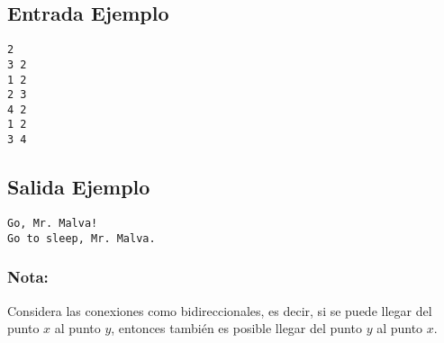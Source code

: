 \begin{multicols}{2}

\subsection*{Entrada Ejemplo}

\begin{verbatim}
2
3 2
1 2
2 3
4 2
1 2
3 4
\end{verbatim}

\columnbreak

\subsection*{Salida Ejemplo}

\begin{verbatim}
Go, Mr. Malva!
Go to sleep, Mr. Malva.
\end{verbatim}

\end{multicols}



\subsubsection*{Nota:}
Considera las conexiones como bidireccionales, es decir,
si se puede llegar del punto $x$ al punto $y$, entonces
también es posible llegar del punto $y$ al punto $x$.